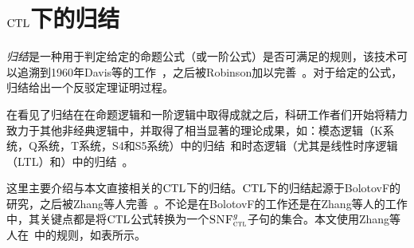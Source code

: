 \section{$\textrm{CTL}$下的归结}

\emph{归结}是一种用于判定给定的命题公式（或一阶公式）是否可满足的规则，该技术可以追溯到1960年Davis等的工作~\cite{DBLP:journals/jacm/DavisP60}，之后被Robinson加以完善~\cite{DBLP:journals/jacm/Robinson65}。对于给定的公式，归结给出一个反驳定理证明过程。

在看见了归结在在命题逻辑和一阶逻辑中取得成就之后，科研工作者们开始将精力致力于其他非经典逻辑中，并取得了相当显著的理论成果，如：模态逻辑（K系统，Q系统，T系统，S4和S5系统）中的归结~\cite{DBLP:journals/tcs/EnjalbertC89}和时态逻辑（尤其是线性时序逻辑（LTL）和\CTL）中的归结~\cite{DBLP:conf/cade/CavalliC84,DBLP:journals/jetai/BolotovF99}。

这里主要介绍与本文直接相关的$\textrm{CTL}$下的归结。$\textrm{CTL}$下的归结起源于BolotovF的研究\cite{DBLP:journals/jetai/BolotovF99}，之后被Zhang等人完善~\cite{zhang2014resolution}。不论是在BolotovF的工作还是在Zhang等人的工作中，其关键点都是将$\textrm{CTL}$公式转换为一个${\textsc{SNF}_{\textsc{ctl}}^g}$子句的集合。本文使用Zhang等人在~\cite{zhang2014resolution}中的规则，如表所示。

